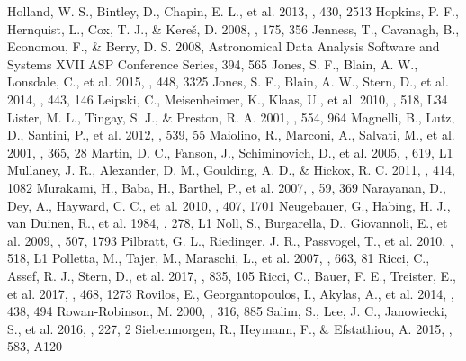 \documentclass[twocolumn]{aastex6}
\begin{document}
\begin{thebibliography}{}
Holland, W. S., Bintley, D., Chapin, E. L., et al. 2013, \mnras, 430, 2513
Hopkins, P. F., Hernquist, L., Cox, T. J., \& Kere\v{s}, D. 2008, \apjs, 175, 356
Jenness, T., Cavanagh, B., Economou, F., \& Berry, D. S. 2008, Astronomical Data Analysis Software and Systems XVII ASP Conference Series, 394, 565
Jones, S. F., Blain, A. W., Lonsdale, C., et al. 2015, \mnras, 448, 3325
Jones, S. F., Blain, A. W., Stern, D., et al. 2014, \mnras, 443, 146
Leipski, C., Meisenheimer, K., Klaas, U., et al. 2010, \aap, 518, L34
Lister, M. L., Tingay, S. J., \& Preston, R. A. 2001, \apj, 554, 964
Magnelli, B., Lutz, D., Santini, P., et al. 2012, \aap, 539, 55
Maiolino, R., Marconi, A., Salvati, M., et al. 2001, \aap, 365, 28
Martin, D. C., Fanson, J., Schiminovich, D., et al. 2005, \apjl, 619, L1
Mullaney, J. R., Alexander, D. M., Goulding, A. D., \& Hickox, R. C. 2011, \mnras, 414, 1082
Murakami, H., Baba, H., Barthel, P., et al. 2007, \pasj, 59, 369
Narayanan, D., Dey, A., Hayward, C. C., et al. 2010, \mnras, 407, 1701
Neugebauer, G., Habing, H. J., van Duinen, R., et al. 1984, \apjl, 278, L1
Noll, S., Burgarella, D., Giovannoli, E., et al. 2009, \aap, 507, 1793
Pilbratt, G. L., Riedinger, J. R., Passvogel, T., et al. 2010, \aap, 518, L1
Polletta, M., Tajer, M., Maraschi, L., et al. 2007, \apj, 663, 81
Ricci, C., Assef, R. J., Stern, D., et al. 2017, \apj, 835, 105
Ricci, C., Bauer, F. E., Treister, E., et al. 2017, \mnras, 468, 1273
Rovilos, E., Georgantopoulos, I., Akylas, A., et al. 2014, \mnras, 438, 494
Rowan-Robinson, M. 2000, \mnras, 316, 885
Salim, S., Lee, J. C., Janowiecki, S., et al. 2016, \apjs, 227, 2
Siebenmorgen, R., Heymann, F., \& Efstathiou, A. 2015, \aap, 583, A120

\end{thebibliography}
\end{document}
